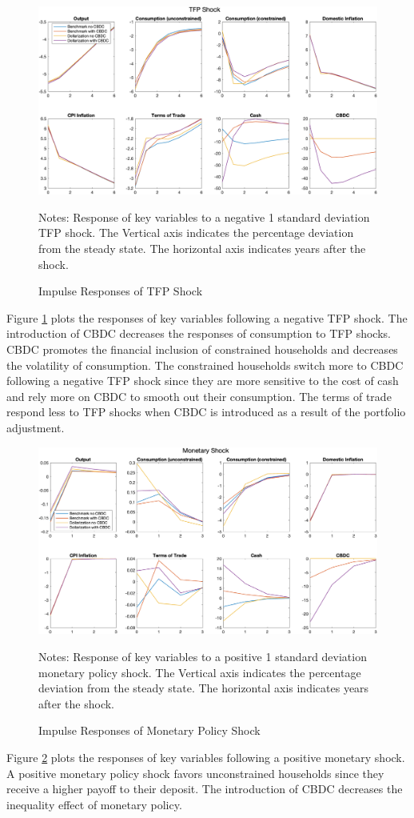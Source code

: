 \documentclass[12pt]{article}
\begin{document}
\begin{figure}[h!]
\includegraphics[width=\textwidth]{TFP}
\caption{Impulse Responses of TFP Shock}
\label{IRF1}
\scriptsize{Notes: Response of key variables to a negative 1 standard deviation TFP shock. The Vertical axis indicates the percentage deviation from the steady state. The horizontal axis indicates years after the shock. }
\end{figure}
Figure \ref{IRF1} plots the responses of key variables following a negative TFP shock. The introduction of CBDC decreases the responses of consumption to TFP shocks. CBDC promotes the financial inclusion of constrained households and decreases the volatility of consumption. The constrained households switch more to CBDC following a negative TFP shock since they are more sensitive to the cost of cash and rely more on CBDC to smooth out their consumption. The terms of trade respond less to TFP shocks when CBDC is introduced as a result of the portfolio adjustment. 

\begin{figure}[h!]
\includegraphics[width=\textwidth]{Monetary}
\caption{Impulse Responses of Monetary Policy Shock}
\label{IRF2}
\scriptsize{Notes: Response of key variables to a positive 1 standard deviation monetary policy shock. The Vertical axis indicates the percentage deviation from the steady state. The horizontal axis indicates years after the shock. }
\end{figure}
Figure \ref{IRF2} plots the responses of key variables following a positive monetary shock. A positive monetary policy shock favors unconstrained households since they receive a higher payoff to their deposit. The introduction of CBDC decreases the inequality effect of monetary policy. 
\end{document}
